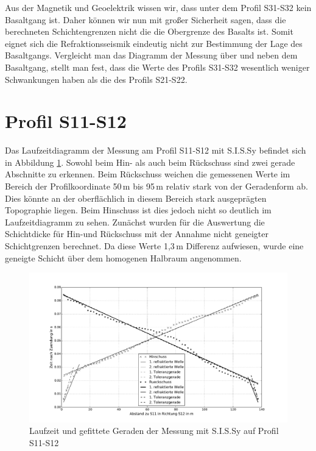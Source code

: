 Aus der Magnetik und Geoelektrik wissen wir, dass unter dem Profil S31-S32 kein Basaltgang ist. Daher können wir nun mit großer Sicherheit sagen, dass die berechneten Schichtengrenzen nicht die die Obergrenze des Basalts ist. Somit eignet sich die Refraktionsseismik eindeutig nicht zur Bestimmung der Lage des Basaltgangs. Vergleicht man das Diagramm der Messung über und neben dem Basaltgang, stellt man fest, dass die Werte des Profils S31-S32 wesentlich weniger Schwankungen haben als die des Profils S21-S22.

\section{Profil S11-S12}

Das Laufzeitdiagramm der Messung am Profil S11-S12 mit S.I.S.Sy befindet sich in Abbildung \ref{fig:plotsissy}. Sowohl beim Hin- als auch beim Rückschuss sind zwei gerade Abschnitte zu erkennen. Beim Rückschuss weichen die gemessenen Werte im Bereich der Profilkoordinate 50\,m bis 95\,m relativ stark von der Geradenform ab. Dies könnte an der oberflächlich in diesem Bereich stark ausgeprägten Topographie liegen. Beim Hinschuss ist dies jedoch nicht so deutlich im Laufzeitdiagramm zu sehen. Zunächst wurden für die Auswertung die Schichtdicke für Hin-und Rückschuss mit der Annahme nicht geneigter Schichtgrenzen berechnet. Da diese Werte 1,3\,m Differenz aufwiesen, wurde eine geneigte Schicht über dem homogenen Halbraum angenommen.

\begin{figure}[!ht]
 \centering
 \includegraphics[width=\textwidth]{fig/plotsissy}
 \caption{Laufzeit und gefittete Geraden der Messung mit S.I.S.Sy auf Profil S11-S12}
 \label{fig:plotsissy}
\end{figure}

